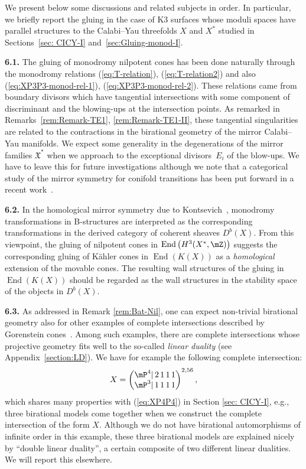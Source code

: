 \documentclass[pdftex]{sigma}
\numberwithin{equation}{section}
\begin{document}
We present below some discussions and related subjects in order. In particular, we briefly report the gluing in the case of K3 surfaces whose moduli spaces have parallel structures to the Calabi--Yau threefolds $X$ and $X^{*}$ studied in Sections~\ref{sec: CICY-I} and~\ref{sec:Gluing-monod-I}.

{\bf 6.1.} The gluing of monodromy nilpotent cones has been done naturally through the monodromy relations (\ref{eq:T-relation}), (\ref{eq:T-relation2}) and also (\ref{eq:XP3P3-monod-rel-1}), (\ref{eq:XP3P3-monod-rel-2}). These relations came from boundary divisors which have tangential intersections with some component of discriminant and the blowing-ups at the intersection points. As remarked in Remarks~\ref{rem:Remark-TE1}, \ref{rem:Remark-TE1-II}, these tangential singularities are related to the contractions in the birational geometry of the mirror Calabi--Yau manifolds. We expect some generality in the degenerations of the mirror families $\mathfrak{X}^{*}$ when we approach to the exceptional divisors~$E_{i}$ of the blow-ups. We have to leave this for future investigations although we note that a categorical study of the mirror symmetry for conifold transitions has been put forward in a recent work~\cite{FHLY}.

{\bf 6.2.} In the homological mirror symmetry due to Kontsevich~\cite{Ko}, monodromy transformations in B-structures are interpreted as the corresponding transformations in the derived category of coherent sheaves $D^{b}(X)$. From this viewpoint, the gluing of nilpotent cones in $\operatorname{End}\big(H^{3}(X^{*},\mZ)\big)$ suggests the corresponding gluing of K\"ahler cones in $\operatorname{End}(K(X))$ as a \textit{homological} extension of the movable cones. The resulting wall structures of the gluing in $\operatorname{End}(K(X))$ should be regarded as the wall structures in the stability space \cite{Brid} of the objects in $D^{b}(X)$.

{\bf 6.3.} As addressed in Remark \ref{rem:Bat-Nil}, one can expect non-trivial birational geometry also for other examples of complete intersections described by Gorenstein cones~\cite{BatNil}. Among such examples, there are complete intersections whose projective geometry fits well to the so-called \textit{linear duality} (see Appendix~\ref{section:LD}). We have for example the following complete intersection:
\begin{gather*}
X=\left(\begin{matrix}\mP^{4}|\,2\,1\,1\,1\\
\mP^{3}|\,1\,1\,1\,1
\end{matrix}\right)^{2,56},
\end{gather*}
which shares many properties with (\ref{eq:XP4P4}) in Section \ref{sec: CICY-I}, e.g., three birational models come together when we construct the complete intersection of the form $X$. Although we do not have birational
automorphisms of infinite order in this example, these three birational models are explained nicely by ``double linear duality'', a certain composite of two different linear dualities. We will report this elsewhere.
\end{document}
